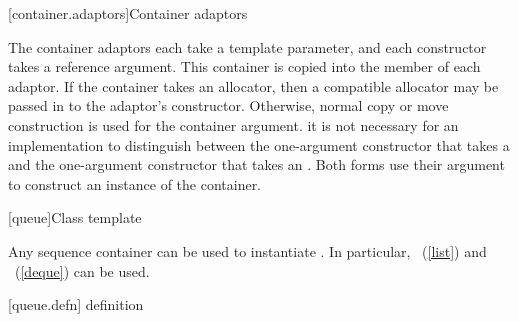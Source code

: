 \documentclass[american,twoside]{book}
\begin{document}
[container.adaptors]{Container adaptors}

\pnum
The container adaptors each take a  template parameter, and each constructor takes a  reference argument. This container is copied into the  member of each adaptor. If the container takes an allocator, then a compatible allocator may be passed in to the adaptor's constructor. Otherwise, normal copy or move construction is used for the container argument. \enternote it is not necessary for an implementation to distinguish between the one-argument constructor that takes a  and the one-argument constructor that takes an . Both forms use their argument to construct an instance of the container. \exitnote

[queue]{Class template }

\pnum
{}%
Any sequence container 
can be used to instantiate
.
In particular,
\
(\ref{list})
and
\
(\ref{deque})
can be used.

[queue.defn]{ definition}
\end{document}
